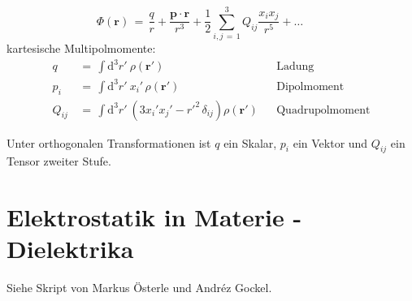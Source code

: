 \documentclass[titlepage,11pt,a4paper,ngerman]{report}
\newcommand{\prt}[2]{\frac{\partial #1}{\partial #2}}
\newcommand{\dd}{\mathrm{d}}
\renewcommand{\vec}[1]{\boldsymbol{#1}}
\newcommand{\vabla}{\boldsymbol{\nabla}}
\renewcommand{\paragraph}[1]{\subsubsection{#1}}
\newcommand{\eq}{\,=\,}
\begin{document}
\[\Phi(\vec{r})\eq \frac{q}{r}+\frac{\vec{p}\cdot\vec{r}}{r^3}+\frac{1}{2}\sum_{i,j\eq 1}^{3}Q_{ij}\frac{x_ix_j}{r^5}+\dots\qquad\tag{$r>R_0$}\]
\noindent
kartesische Multipolmomente:
\begin{align*}
q&\eq \int\dd^3r'\ \rho(\vec{r}')&&\text{Ladung}\\
p_i&\eq \int\dd^3r'\ x_i'\,\rho(\vec{r}')&&\text{Dipolmoment}\\
Q_{ij}&\eq \int\dd^3 r'\ (3x_i'x_j'-r'^2\, \delta_{ij})\rho(\vec{r}')&&\text{Quadrupolmoment}
\end{align*}

Unter orthogonalen Transformationen ist $q$ ein Skalar, $p_i$ ein Vektor und $Q_{ij}$ ein Tensor zweiter Stufe.





\newpage
\section{Elektrostatik in Materie - Dielektrika}
Siehe Skript von Markus Österle und Andréz Gockel.

\end{document}

